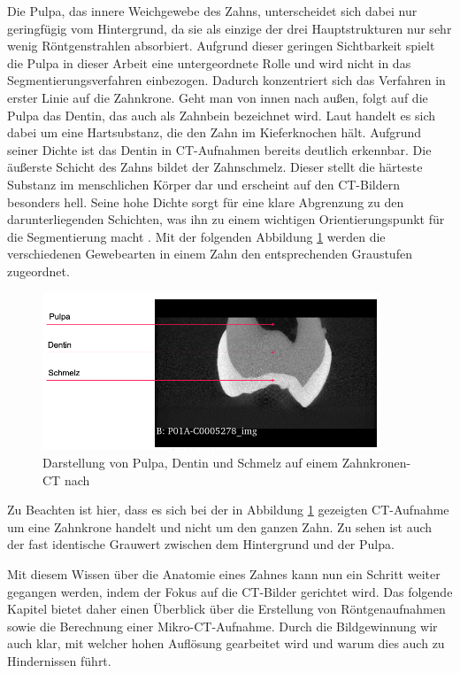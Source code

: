 Die Pulpa, das innere Weichgewebe des Zahns, unterscheidet sich dabei nur geringfügig
vom Hintergrund, da sie als einzige der drei Hauptstrukturen nur sehr wenig
Röntgenstrahlen absorbiert. Aufgrund dieser geringen Sichtbarkeit spielt die Pulpa
in dieser Arbeit eine untergeordnete Rolle und wird nicht in das Segmentierungsverfahren
einbezogen. Dadurch konzentriert sich das Verfahren in erster Linie auf die
Zahnkrone. Geht man von innen nach außen, folgt auf die Pulpa das Dentin, das auch
als Zahnbein bezeichnet wird. Laut \citet[S.~41]{lehmann2012Zahnheilkunde} handelt
es sich dabei um eine Hartsubstanz, die den Zahn im Kieferknochen hält. Aufgrund
seiner Dichte ist das Dentin in \ac{CT}-Aufnahmen bereits deutlich erkennbar. Die
äußerste Schicht des Zahns bildet der Zahnschmelz. Dieser stellt die härteste
Substanz im menschlichen Körper dar und erscheint auf den \ac{CT}-Bildern besonders
hell. Seine hohe Dichte sorgt für eine klare Abgrenzung zu den darunterliegenden
Schichten, was ihn zu einem wichtigen Orientierungspunkt für die Segmentierung macht
\citep[vgl.][S.~41]{lehmann2012Zahnheilkunde}. Mit der folgenden Abbildung \ref{fig:pulpa_dentin_schmelz}
werden die verschiedenen Gewebearten in einem Zahn den entsprechenden Graustufen
zugeordnet.

\begin{figure}[h]
	\centering
	\includegraphics[width=0.9\textwidth]{img/dentin_schmelz_pulpa.png}
	\caption{Darstellung von Pulpa, Dentin und Schmelz auf einem Zahnkronen-CT nach
	\citet{heck2024}}
	\label{fig:pulpa_dentin_schmelz}
\end{figure}

Zu Beachten ist hier, dass es sich bei der in Abbildung \ref{fig:pulpa_dentin_schmelz}
gezeigten \ac{CT}-Aufnahme um eine Zahnkrone handelt und nicht um den ganzen
Zahn. Zu sehen ist auch der fast identische Grauwert zwischen dem Hintergrund und
der Pulpa.

Mit diesem Wissen über die Anatomie eines Zahnes kann nun ein Schritt weiter gegangen
werden, indem der Fokus auf die \ac{CT}-Bilder gerichtet wird. Das folgende
Kapitel bietet daher einen Überblick über die Erstellung von Röntgenaufnahmen
sowie die Berechnung einer Mikro-\ac{CT}-Aufnahme. Durch die Bildgewinnung wir
auch klar, mit welcher hohen Auflösung gearbeitet wird und warum dies auch zu Hindernissen
führt.

